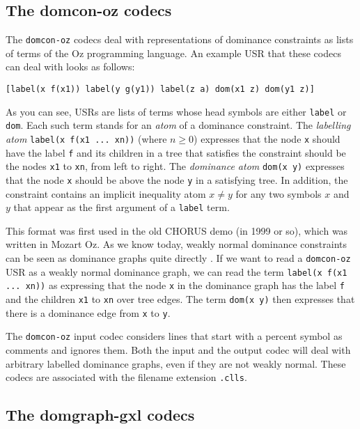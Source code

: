 \subsection{The domcon-oz codecs}

The \verb?domcon-oz? codecs deal with representations of dominance
constraints \cite{clls2000} as lists of terms of the Oz programming
language. An example USR that these codecs can deal with looks as
follows:

\begin{verbatim}
[label(x f(x1)) label(y g(y1)) label(z a) dom(x1 z) dom(y1 z)]
\end{verbatim}

As you can see, USRs are lists of terms whose head symbols are either
\verb?label? or \verb?dom?. Each such term stands for an \emph{atom}
of a dominance constraint. The \emph{labelling atom}
\verb?label(x f(x1 ... xn))?  (where $n \geq 0$) expresses that the
node \verb?x? should have the label \verb?f? and its children in a
tree that satisfies the constraint should be the nodes \verb?x1? to
\verb?xn?, from left to right. The \emph{dominance atom}
\verb?dom(x y)? expresses that the node \verb?x? should be above the
node \verb?y? in a satisfying tree. In addition, the constraint
contains an implicit inequality atom $x \neq y$ for any two symbols
$x$ and $y$ that appear as the first argument of a \verb?label? term.

This format was first used in the old CHORUS demo (in 1999 or so),
which was written in Mozart Oz. As we know today, weakly normal
dominance constraints can be seen as dominance graphs quite directly
\cite{Koller04}. If we want to read a \verb?domcon-oz?  USR as a
weakly normal dominance graph, we can read the term
\verb?label(x f(x1 ... xn))? as expressing that the node \verb?x? in
the dominance graph has the label \verb?f? and the children \verb?x1?
to \verb?xn? over tree edges. The term \verb?dom(x y)? then expresses
that there is a dominance edge from \verb?x? to \verb?y?. 

The \verb?domcon-oz? input codec considers lines that start with a
percent symbol as comments and ignores them. Both the input and the
output codec will deal with arbitrary labelled dominance graphs, even
if they are not weakly normal. These codecs are associated with the
filename extension \verb?.clls?.



\subsection{The domgraph-gxl codecs}

